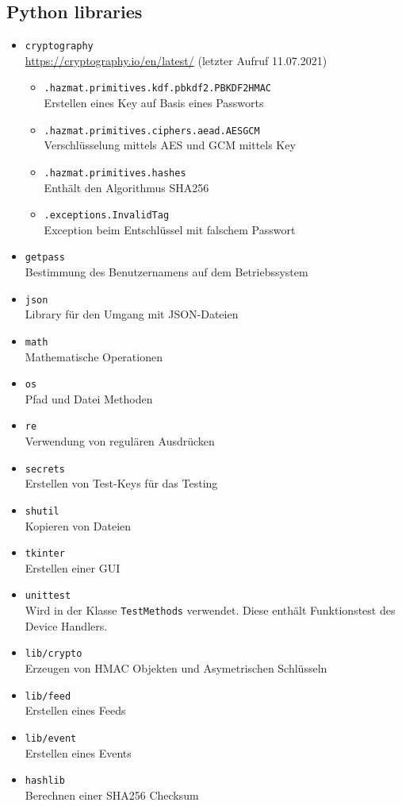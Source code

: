 \documentclass[a4paper,titlepage]{article}
\newcommand{\ilc}[1]{\textcolor{codeColor}{\texttt{#1}}}
\begin{document}
	\subsection{Python libraries} \label{libraries} %
		\begin{itemize}
			\item \ilc{cryptography} \\
				\url{https://cryptography.io/en/latest/} (letzter Aufruf 11.07.2021)
				\begin{itemize}[label={}]
				\item \ilc{.hazmat.primitives.kdf.pbkdf2.PBKDF2HMAC} \\
					Erstellen eines Key auf Basis eines Passworts
				\item \ilc{.hazmat.primitives.ciphers.aead.AESGCM} \\
					Verschlüsselung mittels AES und GCM mittels Key
				\item \ilc{.hazmat.primitives.hashes}\\
					Enthält den Algorithmus SHA256
				\item \ilc{.exceptions.InvalidTag}\\
					Exception beim Entschlüssel mit falschem Passwort 
				\end{itemize}
			\item \ilc{getpass} \\
				Bestimmung des Benutzernamens auf dem Betriebssystem
			\item \ilc{json} \\
				Library für den Umgang mit JSON-Dateien
			\item \ilc{math} \\
				Mathematische Operationen
			\item \ilc{os} \\
				Pfad und Datei Methoden
			\item \ilc{re} \\
				Verwendung von regulären Ausdrücken	
			\item \ilc{secrets} \\
				Erstellen von Test-Keys für das Testing
			\item \ilc{shutil} \\
				Kopieren von Dateien
			\item \ilc{tkinter} \\
				Erstellen einer GUI				
			\item \ilc{unittest} \\
				Wird in der Klasse \ilc{TestMethods} verwendet. Diese enthält Funktionstest des Device Handlers.
			\item \ilc{lib/crypto} \\
				Erzeugen von HMAC Objekten und Asymetrischen Schlüsseln
			\item \ilc{lib/feed} \\
				Erstellen eines Feeds 
			\item \ilc{lib/event} \\
				Erstellen eines Events 
			\item \ilc{hashlib} \\
				Berechnen einer SHA256 Checksum 
		\end{itemize}
		
\end{document}
